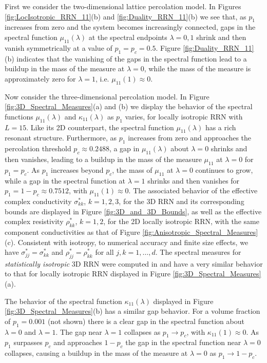 \documentclass{cmslatex}
\begin{document}
First we consider the two-dimensional lattice percolation model. In
Figures \ref{fig:LocIsotropic_RRN_11}(b) and
\ref{fig:Duality_RRN_11}(b) we see that, as $p_1$ increases from zero 
and the system becomes increasingly connected, gaps in the spectral
function $\mu_{11}(\lambda)$ at the spectral endpoints $\lambda=0,1$ shrink and then
vanish  symmetrically at a value of $p_1=p_c=0.5$. Figure
\ref{fig:Duality_RRN_11}(b) indicates that the vanishing of the gaps
in the spectral function lead to a buildup in the mass of the measure at
$\lambda=0$, while the mass of the measure is approximately zero for $\lambda=1$,
i.e. $\mu_{11}(1)\approx0$.



Now consider the three-dimensional percolation model. In Figure
\ref{fig:3D_Spectral_Measures}(a) and (b) we display 
the behavior of the spectral functions $\mu_{11}(\lambda)$ and $\kappa_{11}(\lambda)$
as $p_1$ varies, for locally isotropic RRN with $L=15$. Like its
2D counterpart, the spectral function $\mu_{11}(\lambda)$ has a rich resonant
structure. Furthermore, as $p_1$ increases from zero and approaches
the percolation threshold $p_c\approx0.2488$, a gap in $\mu_{11}(\lambda)$ about
$\lambda=0$ shrinks and then vanishes, leading to a buildup in the mass of
the measure $\mu_{11}$ at $\lambda=0$ for 
$p_1=p_c$. As $p_1$ increases beyond $p_c$, the mass of $\mu_{11}$ at
$\lambda=0$ continues to grow, while a gap in the spectral function at $\lambda=1$ 
shrinks and then vanishes for $p_1=1-p_c\approx0.7512$, with
$\mu_{11}(1)\approx0$. The associated behavior of the effective complex
conductivity $\sigma^*_{kk}$, $k=1,2,3$, for the 3D 
RRN and its corresponding bounds are displayed in Figure
\ref{fig:3D_and_3D_Bounds}, as well as the effective complex
resistivity $\rho^*_{kk}$, $k=1,2$, for the 2D locally isotropic RRN,
with the same component conductivities as that of Figure
\ref{fig:Anisotropic_Spectral_Measures}(c). Consistent with isotropy,
to numerical accuracy and finite size effects, we have
$\sigma^*_{jj}=\sigma^*_{kk}$ and $\rho^*_{jj}=\rho^*_{kk}$ for all $j,k=1,\ldots,d$. The spectral measures for
\emph{statistically isotropic} 3D RRN  were computed in
\cite{Murphy:JMP:063506} and have a very similar behavior to that for
locally isotropic RRN displayed in Figure
\ref{fig:3D_Spectral_Measures}(a).    



The behavior of the spectral function $\kappa_{11}(\lambda)$ displayed in Figure
\ref{fig:3D_Spectral_Measures}(b) has a similar gap behavior. For a
volume fraction of $p_1=0.001$ (not shown) there is a clear gap in the
spectral function about $\lambda=0$ and $\lambda=1$. The gap near $\lambda=1$ collapses
as $p_1\to p_c$, with $\kappa_{11}(1)\approx0$. As $p_1$ surpasses $p_c$ and
approaches $1-p_c$ the gap in the spectral function near $\lambda=0$
collapses, causing a buildup in the mass of the measure at $\lambda=0$ as
$p_1\to1-p_c$. 
\end{document}
